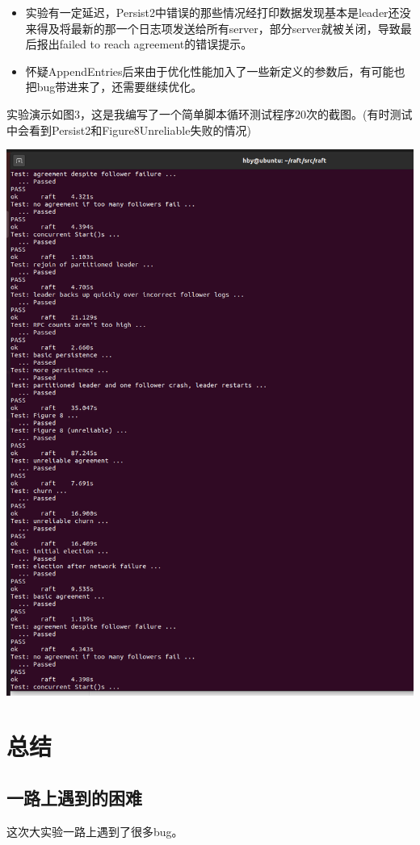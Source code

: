 \documentclass[UTF8]{article}
\begin{document}
\begin{itemize}
    \item 实验有一定延迟，Persist2中错误的那些情况经打印数据发现基本是leader还没来得及将最新的那一个日志项发送给所有server，部分server就被关闭，导致最后报出failed to reach agreement的错误提示。
    \item 怀疑AppendEntries后来由于优化性能加入了一些新定义的参数后，有可能也把bug带进来了，还需要继续优化。
\end{itemize}
实验演示如图3，这是我编写了一个简单脚本循环测试程序20次的截图。(有时测试中会看到Persist2和Figure8Unreliable失败的情况)


  \includegraphics[scale=0.4]{pic2.png}


\section{总结}

\subsection{一路上遇到的困难}
这次大实验一路上遇到了很多bug。
\end{document}
